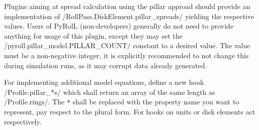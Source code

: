 \documentclass[11pt]{PyRollDocs}
\begin{document}
    Plugins aiming at spread calculation using the pillar approad should provide an implementation of \py/RollPass.DiskElement.pillar_spreads/ yielding the respective values.
    Users of PyRolL (non-developers) generally do not need to provide anything for usage of this plugin, except they may set the \py/pyroll.pillar_model.PILLAR_COUNT/ constant to a desired value.
    The value must be a non-negative integer, it is explicitly recommended to not change this during simulation runs, as it may corrupt data already generated.

    For implementing additional model equations, define a new hook \py/Profile.pillar_*s/ which shall return an array of the same length as \py/Profile.rings/.
    The \texttt{*} shall be replaced with the property name you want to represent, pay respect to the plural form.
    For hooks on units or disk elements act respectively.

    \printbibliography
\end{document}
